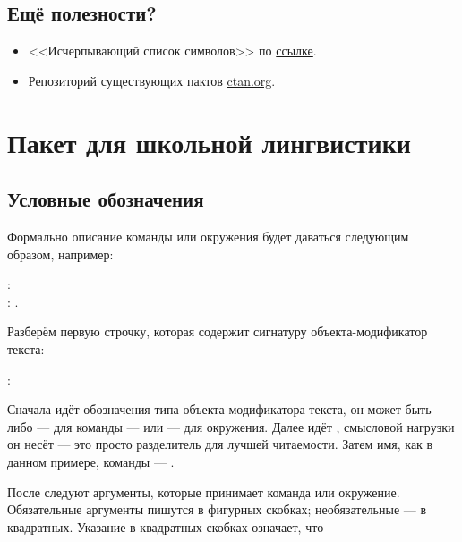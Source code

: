\section{Ещё полезности?}

\begin{itemize}
    \setlength{\itemsep}{0pt}
    \item <<Исчерпывающий список символов>> по \href{http://tug.ctan.org/info/symbols/comprehensive/symbols-a4.pdf}{ссылке}.
    \item Репозиторий существующих пактов \href{ctan.org}{ctan.org}.
\end{itemize}



\chapter{Пакет  для школьной лингвистики}


\section{Условные обозначения}

Формально описание команды или окружения будет даваться следующим образом, например:
\begin{tcolorbox}
    \small
    \rsTypeAux: \\
    \hspace*{1cm} \rsOptionsAux: . 
\end{tcolorbox}

Разберём первую строчку, которая содержит сигнатуру объекта-модификатор текста:
\begin{center}
    \rsTypeAux:
\end{center}
Сначала идёт обозначения типа объекта-модификатора текста, он может быть либо \rsTypeAux\space --- для команды --- или \rsTypeAux[env] --- для окружения. Далее идёт \rsCodeAux{:}, смысловой нагрузки он несёт --- это просто разделитель для лучшей читаемости. Затем имя, как в данном примере, команды --- . 

После следуют аргументы, которые принимает команда или окружение. Обязательные аргументы пишутся в фигурных скобках; необязательные --- в квадратных. Указание \rsOptionsAux\space в квадратных скобках означает, что 




